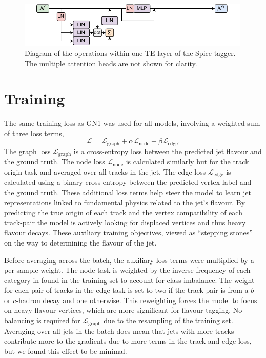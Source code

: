 \begin{figure}[h!]
    \centering
    \includegraphics[width=0.99\textwidth]{figures/flavour_tagging/spice.pdf}
    \caption{Diagram of the operations within one TE layer of the Spice tagger. The multiple attention heads are not shown for clarity.}
    \label{fig:spice_graph}
\end{figure}

\section{Training}

The same training loss as GN1 was used for all models, involving a weighted sum of three loss terms,
\begin{equation}
  \mathcal{L} = \mathcal{L}_{\text{graph}} + \alpha \mathcal{L}_{\text{node}} + \beta \mathcal{L}_{\text{edge}}.
\end{equation}
The graph loss $\mathcal{L}_{\text{graph}}$ is a cross-entropy loss between the predicted jet flavour and the ground truth.
The node loss $\mathcal{L}_{\text{node}}$ is calculated similarly but for the track origin task and averaged over all tracks in the jet.
The edge loss $\mathcal{L}_{\text{edge}}$ is calculated using a binary cross entropy between the predicted vertex label and the ground truth.
These additional loss terms help steer the model to learn jet representations linked to fundamental physics related to the jet's flavour.
By predicting the true origin of each track and the vertex compatibility of each track-pair the model is actively looking for displaced vertices and thus heavy flavour decays.
These auxiliary training objectives, viewed as ``stepping stones''~\cite{GN1} on the way to determining the flavour of the jet.

Before averaging across the batch, the auxiliary loss terms were multiplied by a per sample weight.
The node task is weighted by the inverse frequency of each category in  found in the training set to account for class imbalance.
The weight for each pair of tracks in the edge task is set to two if the track pair is from a $b$- or $c$-hadron decay and one otherwise.
This reweighting forces the model to focus on heavy flavour vertices, which are more significant for flavour tagging.
No balancing is required for $\mathcal{L}_{\text{graph}}$ due to the resampling of the training set.
Averaging over all jets in the batch does mean that jets with more tracks contribute more to the gradients due to more terms in the track and edge loss, but we found this effect to be minimal.

